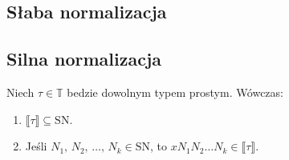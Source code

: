 \subsection{Słaba normalizacja}

\subsection{Silna normalizacja}

\begin{lemat}\label{thm:sn_lemat1}
  Niech \(\tau\in\mathbb{T}\) bedzie dowolnym typem prostym. Wówczas:
  \begin{enumerate}[label=(\arabic*)]
    \setlength\itemsep{0em}
    \item \(\llbracket \tau \rrbracket  \subseteq \mathrm{SN}\).\label{def:l1_a}
    \item Jeśli \(N_1,\,N_2,\,\dots,\,N_k\in\mathrm{SN}\), to \(xN_1 N_2 \dots N_k \in \llbracket \tau \rrbracket\).\label{def:l1_b}
  \end{enumerate}
\end{lemat}
